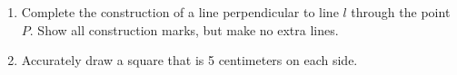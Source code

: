\documentclass[12pt, twoside]{article}
\begin{document}
\begin{enumerate}
\newpage
  \item Complete the construction of a line perpendicular to line $l$ through the point $P$. Show all construction marks, but make no extra lines. \vspace{3cm}
  \begin{center}
  \end{center} \vspace{7cm}

  \item Accurately draw a square that is 5 centimeters on each side.


\end{enumerate}
\end{document}
